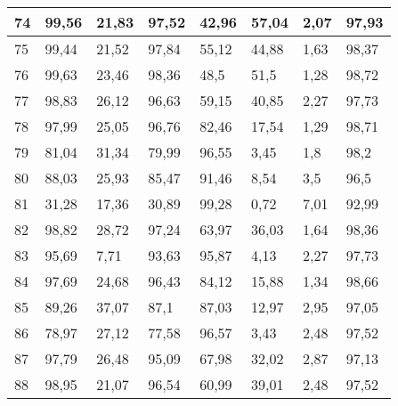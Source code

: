 \begin{longtable}[c]{|l|l|l|l|l|l|l|l|}
74              & 99,56        & 21,83        & 97,52       & 42,96         & 57,04         & 2,07          & 97,93         \\ \hline
75              & 99,44        & 21,52        & 97,84       & 55,12         & 44,88         & 1,63          & 98,37         \\ \hline
76              & 99,63        & 23,46        & 98,36       & 48,5          & 51,5          & 1,28          & 98,72         \\ \hline
77              & 98,83        & 26,12        & 96,63       & 59,15         & 40,85         & 2,27          & 97,73         \\ \hline
78              & 97,99        & 25,05        & 96,76       & 82,46         & 17,54         & 1,29          & 98,71         \\ \hline
79              & 81,04        & 31,34        & 79,99       & 96,55         & 3,45          & 1,8           & 98,2          \\ \hline
80              & 88,03        & 25,93        & 85,47       & 91,46         & 8,54          & 3,5           & 96,5          \\ \hline
81              & 31,28        & 17,36        & 30,89       & 99,28         & 0,72          & 7,01          & 92,99         \\ \hline
82              & 98,82        & 28,72        & 97,24       & 63,97         & 36,03         & 1,64          & 98,36         \\ \hline
83              & 95,69        & 7,71         & 93,63       & 95,87         & 4,13          & 2,27          & 97,73         \\ \hline
84              & 97,69        & 24,68        & 96,43       & 84,12         & 15,88         & 1,34          & 98,66         \\ \hline
85              & 89,26        & 37,07        & 87,1        & 87,03         & 12,97         & 2,95          & 97,05         \\ \hline
86              & 78,97        & 27,12        & 77,58       & 96,57         & 3,43          & 2,48          & 97,52         \\ \hline
87              & 97,79        & 26,48        & 95,09       & 67,98         & 32,02         & 2,87          & 97,13         \\ \hline
88              & 98,95        & 21,07        & 96,54       & 60,99         & 39,01         & 2,48          & 97,52         \\ \hline

\end{longtable}
